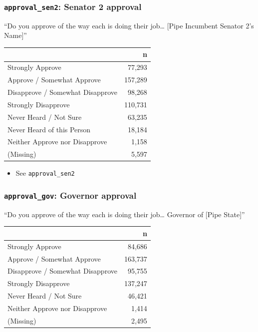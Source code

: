 \documentclass[10pt,article,oneside]{memoir}
\theoremstyle{definition}
\begin{document}
\hypertarget{approval_sen2-senator-2-approval}{%
\subsubsection{\texorpdfstring{\texttt{approval\_sen2}: Senator 2
approval}{approval\_sen2: Senator 2 approval}}\label{approval_sen2-senator-2-approval}}

``Do you approve of the way each is doing their job\ldots{} {[}Pipe
Incumbent Senator 2's Name{]}''

\begin{table}[H]
\centering
\begin{tabular}{lr}
\toprule
 & n\\
\midrule
Strongly Approve & 77,293\\
Approve / Somewhat Approve & 157,289\\
Disapprove / Somewhat Disapprove & 98,268\\
Strongly Disapprove & 110,731\\
Never Heard / Not Sure & 63,235\\
Never Heard of this Person & 18,184\\
Neither Approve nor Disapprove & 1,158\\
(Missing) & 5,597\\
\bottomrule
\end{tabular}
\end{table}

\begin{itemize}
\tightlist
\item
  See \texttt{approval\_sen2}
\end{itemize}

\hypertarget{approval_gov-governor-approval}{%
\subsubsection{\texorpdfstring{\texttt{approval\_gov}: Governor
approval}{approval\_gov: Governor approval}}\label{approval_gov-governor-approval}}

``Do you approve of the way each is doing their job\ldots{} Governor of
{[}Pipe State{]}''

\begin{table}[H]
\centering
\begin{tabular}{lr}
\toprule
 & n\\
\midrule
Strongly Approve & 84,686\\
Approve / Somewhat Approve & 163,737\\
Disapprove / Somewhat Disapprove & 95,755\\
Strongly Disapprove & 137,247\\
Never Heard / Not Sure & 46,421\\
Neither Approve nor Disapprove & 1,414\\
(Missing) & 2,495\\
\bottomrule
\end{tabular}
\end{table}
\end{document}
